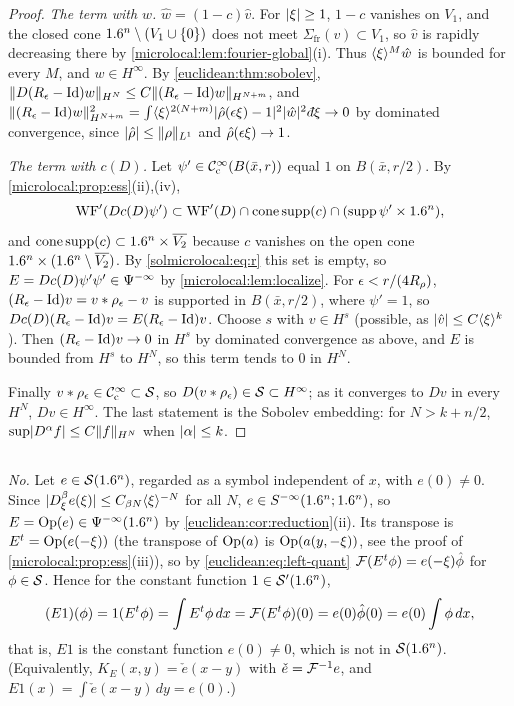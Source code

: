 \begin{proof}
  \emph{The term with $w$.} $\hat w=(1-c)\hat v$. For $\lvert \xi\rvert\ge1$, $1-c$ vanishes on $V_1$, and the
  closed cone $1.6^n\setminus(V_1\cup\{0\})$ does not meet $\Sigma_{\mathrm{fr}}(v)\subset V_1$, so $\hat v$ is
  rapidly decreasing there by \cref{microlocal:lem:fourier-global}(i). Thus $\langle \xi\rangle^M\hat w$ is
  bounded for every $M$, and $w\in H^\infty$. By \cref{euclidean:thm:sobolev},
  $\lVert D(R_\epsilon-\operatorname{Id})w\rVert_{H^N}\le C\lVert (R_\epsilon-\operatorname{Id})w\rVert_{H^{N+m}}$, and
  $\norm{(R_\eps-\Id)w}_{H^{N+m}}^2=\int\ang\xi^{2(N+m)}\abs{\hat\rho(\eps\xi)-1}^2\abs{\hat w}^2\,\dbar\xi\to0$
  by dominated convergence, since $\lvert \hat\rho\rvert\le\lVert \rho\rVert_{L^1}$ and $\hat\rho(\epsilon\xi)\to1$.

  \emph{The term with $c(D)$.} Let $\psi'\in\mathcal{C}^\infty_{\mathrm{c}}(B(\bar x,r))$ equal $1$ on $B(\bar x,r/2)$. By
  \cref{microlocal:prop:ess}(ii),(iv),
  \begin{equation*}
    \operatorname{WF}'(Dc(D)\psi')\subset\operatorname{WF}'(D)\cap\operatorname{cone\,supp}(c)\cap(\operatorname{supp}\psi'\times1.6^n),
  \end{equation*}
  and
  $\operatorname{cone\,supp}(c)\subset1.6^n\times\overline{V_2}$ because $c$ vanishes on the open cone
  $1.6^n\times(1.6^n\setminus\overline{V_2})$. By \eqref{solmicrolocal:eq:r} this set is empty, so
  $E=Dc(D)\psi'\psi'\in\Psi^{-\infty}$ by \cref{microlocal:lem:localize}. For
  $\epsilon<r/(4R_\rho)$, $(R_\epsilon-\operatorname{Id})v=v*\rho_\epsilon-v$ is supported in $B(\bar x,r/2)$, where $\psi'=1$,
  so $Dc(D)(R_\epsilon-\operatorname{Id})v=E(R_\epsilon-\operatorname{Id})v$. Choose $s$ with $v\in H^s$ (possible, as
  $\lvert \hat v\rvert\le C\langle \xi\rangle^k$). Then $(R_\epsilon-\operatorname{Id})v\to0$ in $H^s$ by dominated convergence as above,
  and $E$ is bounded from $H^s$ to $H^N$, so this term tends to $0$ in $H^N$.

  Finally $v*\rho_\epsilon\in\mathcal{C}^\infty_{\mathrm{c}}\subset\mathcal{S}$, so $D(v*\rho_\epsilon)\in\mathcal{S}\subset H^\infty$; as it converges
  to $Dv$ in every $H^N$, $Dv\in H^\infty$. The last statement is the Sobolev embedding: for
  $N>k+n/2$, $\sup\lvert D^\alpha f\rvert\le C\lVert f\rVert_{H^N}$ when $\lvert \alpha\rvert\le k$.
\end{proof}

\subsection*{}
\emph{No.} Let $e\in\mathcal{S}(1.6^n)$, regarded as a symbol independent of $x$, with $e(0)\ne0$. Since
$\lvert D^\beta_\xi e(\xi)\rvert\le C_{\beta N}\langle \xi\rangle^{-N}$ for all $N$, $e\in S^{-\infty}(1.6^n;1.6^n)$, so
$E=\operatorname{Op}(e)\in\Psi^{-\infty}(1.6^n)$ by \cref{euclidean:cor:reduction}(ii). Its transpose is
$E^t=\operatorname{Op}(e(-\xi))$ (the transpose of $\operatorname{Op}(a)$ is $\operatorname{Op}(a(y,-\xi))$, see the proof of
\cref{microlocal:prop:ess}(iii)), so by \eqref{euclidean:eq:left-quant}
$\mathcal{F}(E^t\phi)=e(-\xi)\hat\phi$ for $\phi\in\mathcal{S}$. Hence for the constant function $1\in\mathcal{S}'(1.6^n)$,
\begin{equation*}
  (E1)(\phi)=1(E^t\phi)=\int E^t\phi\,dx=\mathcal{F}(E^t\phi)(0)=e(0)\hat\phi(0)=e(0)\int\phi\,dx,
\end{equation*}
that is, $E1$ is the constant function $e(0)\ne0$, which is not in $\mathcal{S}(1.6^n)$. (Equivalently,
$K_E(x,y)=\check e(x-y)$ with $\check e=\mathcal{F}^{-1}e$, and $E1(x)=\int\check e(x-y)\,dy=e(0)$.)


